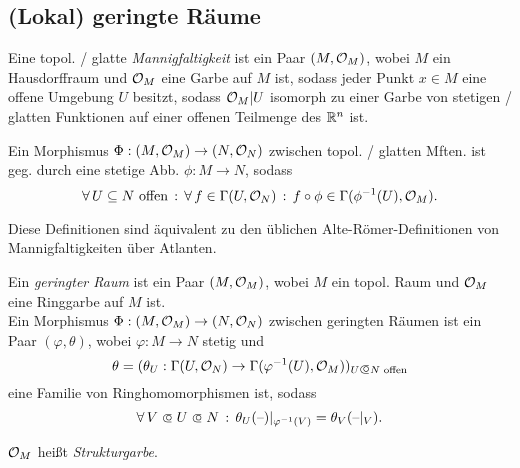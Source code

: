 \documentclass{cheat-sheet}
\begin{document}
\begin{samepage}
  \subsection{(Lokal) geringte Räume}
\end{samepage}


\begin{defn}
  Eine topol. / glatte \emph{Mannigfaltigkeit} ist ein Paar $(M, \mathcal{O}_M)$, wobei $M$ ein Hausdorffraum und $\mathcal{O}_M$ eine Garbe auf $M$ ist, sodass jeder Punkt $x \in M$ eine offene Umgebung $U$ besitzt, sodass $\mathcal{O}_M|U$ isomorph zu einer Garbe von stetigen / glatten Funktionen auf einer offenen Teilmenge des $\mathbb{R}^n$ ist.
\end{defn}

\begin{defn}
  Ein Morphismus $\Phi : (M, \mathcal{O}_M) \to (N, \mathcal{O}_N)$ zwischen topol. / glatten Mften. ist geg. durch eine stetige Abb. $\phi : M \to N$, sodass
  \[
    \forall \, {U \subseteq N \text{ offen}} \,:\, \forall \, {f \in \Gamma(U, \mathcal{O}_N)} \,:\, f \circ \phi \in \Gamma(\phi^{-1}(U), \mathcal{O}_M).
  \]
\end{defn}

\begin{bem}
  Diese Definitionen sind äquivalent zu den üblichen Alte-Römer-Definitionen von Mannigfaltigkeiten über Atlanten.
\end{bem}

\begin{defn}
  Ein \emph{geringter Raum} ist ein Paar $(M, \mathcal{O}_M)$, wobei $M$ ein topol. Raum und $\mathcal{O}_M$ eine Ringgarbe auf $M$ ist. \\
  Ein Morphismus $\Phi : (M, \mathcal{O}_M) \to (N, \mathcal{O}_N)$ zwischen geringten Räumen ist ein Paar $(\varphi, \theta)$, wobei $\varphi : M \to N$ stetig und
  \[ \theta = (\theta_U : \Gamma(U, \O_N) \to \Gamma(\varphi^{-1}(U), \O_M))_{U \opn N \text{ offen}} \]
  eine Familie von Ringhomomorphismen ist, sodass
  \[ \fa{V \opn U \opn N} \theta_U(\blank)|_{\varphi^{-1}(V)} = \theta_V(\blank|_V). \]
\end{defn}

\begin{sprech}
  $\mathcal{O}_M$ heißt \emph{Strukturgarbe}.
\end{sprech}
\end{document}
